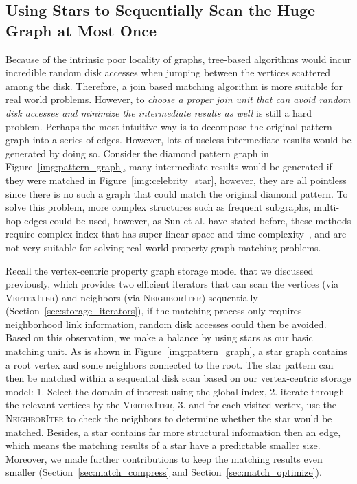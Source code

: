 \subsection{Using Stars to Sequentially Scan the Huge Graph at Most Once}\label{sec:match_star}
Because of the intrinsic poor locality of graphs,
tree-based algorithms would incur incredible random disk accesses when jumping between the vertices scattered among the disk.
Therefore, a join based matching algorithm is more suitable for real world problems.
However, to \emph{choose a proper join unit that can avoid random disk accesses and minimize the intermediate results as well} is still a hard problem.
Perhaps the most intuitive way is to decompose the original pattern graph into a series of edges.
However, lots of useless intermediate results would be generated by doing so.
Consider the diamond pattern graph in Figure~\ref{img:pattern_graph},
many intermediate results would be generated if they were matched in Figure~\ref{img:celebrity_star},
however, they are all pointless since there is no such a graph that could match the original diamond pattern.
To solve this problem, more complex structures such as frequent subgraphs, multi-hop edges could be used,
however, as Sun et al\@. have stated before,
these methods require complex index that has super-linear space and time complexity~\cite{DBLP:journals/pvldb/SunWWSL12}, and are not very suitable for solving real world property graph matching problems.

Recall the vertex-centric property graph storage model that we discussed previously,
which provides two efficient iterators that can scan the vertices (via \textsc{VertexIter}) and neighbors (via \textsc{NeighborIter}) sequentially (Section~\ref{sec:storage_iterators}),
if the matching process only requires neighborhood link information,
random disk accesses could then be avoided.
Based on this observation, we make a balance by using stars as our basic matching unit.
As is shown in Figure~\ref{img:pattern_graph}, a star graph contains a root vertex and some neighbors connected to the root.
The star pattern can then be matched within a sequential disk scan based on our vertex-centric storage model:
1\@. Select the domain of interest using the global index,
2\@. iterate through the relevant vertices by the \textsc{VertexIter},
3\@. and for each visited vertex, use the \textsc{NeighborIter} to check the neighbors to determine whether the star would be matched.
Besides, a star contains far more structural information then an edge,
which means the matching results of a star have a predictable smaller size.
Moreover, we made further contributions to keep the matching results even smaller (Section~\ref{sec:match_compress} and Section~\ref{sec:match_optimize}).

